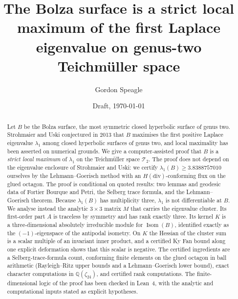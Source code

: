 \documentclass[11pt]{amsart}
\theoremstyle{definition}
\theoremstyle{remark}
\newcommand{\Q}{\mathbb{Q}}
\newcommand{\Teich}{\mathcal{T}_2}
\newcommand{\Isom}{\operatorname{Isom}}
\begin{document}
\title[The Bolza surface is a strict local maximum of $\lambda_1$]%
{The Bolza surface is a strict local maximum of the first Laplace eigenvalue on genus-two Teichm\"uller space}

\author{Gordon Speagle}
\address{Independent Researcher, Boise, ID, USA}

\date{Draft, \today}


\begin{abstract}
Let $B$ be the Bolza surface, the most symmetric closed hyperbolic surface of genus two.
Strohmaier and Uski conjectured in 2013 that $B$ maximises the first positive Laplace
eigenvalue $\lambda_1$ among closed hyperbolic surfaces of genus two, and local maximality has
been asserted on numerical grounds. We give a computer-assisted proof that $B$ is a
\emph{strict local maximum} of $\lambda_1$ on the Teichm\"uller space $\Teich$. The proof does
not depend on the eigenvalue enclosure of Strohmaier and Uski: we certify
$\lambda_1(B)\ge3.8388757010$ ourselves by the Lehmann--Goerisch method with an
$H(\mathrm{div})$-conforming flux on the glued octagon. The proof is conditional on quoted results:
two lemmas and geodesic data of Fortier Bourque and Petri, the Selberg trace formula, and the
Lehmann--Goerisch theorem. Because $\lambda_1(B)$ has multiplicity three, $\lambda_1$ is not differentiable at $B$.
We analyse instead the analytic $3\times 3$ matrix $M$ that carries the eigenvalue cluster. Its
first-order part $A$ is traceless by symmetry and has rank exactly three. Its kernel $K$ is a
three-dimensional absolutely irreducible module for $\Isom(B)$, identified exactly as the
$(-1)$-eigenspace of the antipodal isometry. On $K$ the Hessian of the cluster sum is a scalar
multiple of an invariant inner product, and a certified Ky Fan bound along one explicit
deformation shows that this scalar is negative. The certified ingredients are a
Selberg-trace-formula count, conforming finite elements on the glued octagon in ball
arithmetic (Rayleigh--Ritz upper bounds and a Lehmann--Goerisch lower bound), exact character computations in $\Q(\zeta_{24})$, and certified rank computations.
The finite-dimensional logic of the proof has been checked in Lean~4, with the analytic and
computational inputs stated as explicit hypotheses.
\end{abstract}
\end{document}
